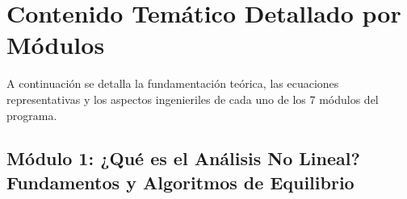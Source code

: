 \documentclass[11pt,letterpaper]{article}
\begin{document}
\section{Contenido Temático Detallado por Módulos}

A continuación se detalla la fundamentación teórica, las ecuaciones representativas y los aspectos ingenieriles de cada uno de los 7 módulos del programa.

\subsection{Módulo 1: ¿Qué es el Análisis No Lineal? Fundamentos y Algoritmos de Equilibrio}
\end{document}
